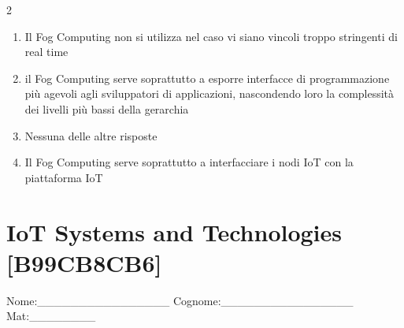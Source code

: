 \documentclass[10pt]{article}
\begin{document}
\begin{multicols}{2}
\begin{enumerate}[label=\arabic*.]
\item Il Fog Computing non si utilizza nel caso vi siano vincoli troppo stringenti di real time
\item il Fog Computing serve soprattutto a esporre interfacce di programmazione più agevoli agli sviluppatori di applicazioni, nascondendo loro la complessità dei livelli più bassi della gerarchia
\item Nessuna delle altre risposte
\item Il Fog Computing serve soprattutto a interfacciare i nodi IoT con la piattaforma IoT
\end{enumerate}
\end{multicols}

\newpage

\section*{IoT Systems and Technologies \footnotesize [B99CB8CB6]}
{\footnotesize Nome:\_\_\_\_\_\_\_\_\_\_\_\_\_\_\_\_ Cognome:\_\_\_\_\_\_\_\_\_\_\_\_\_\_\_\_ Mat:\_\_\_\_\_\_\_\_}
\end{document}
